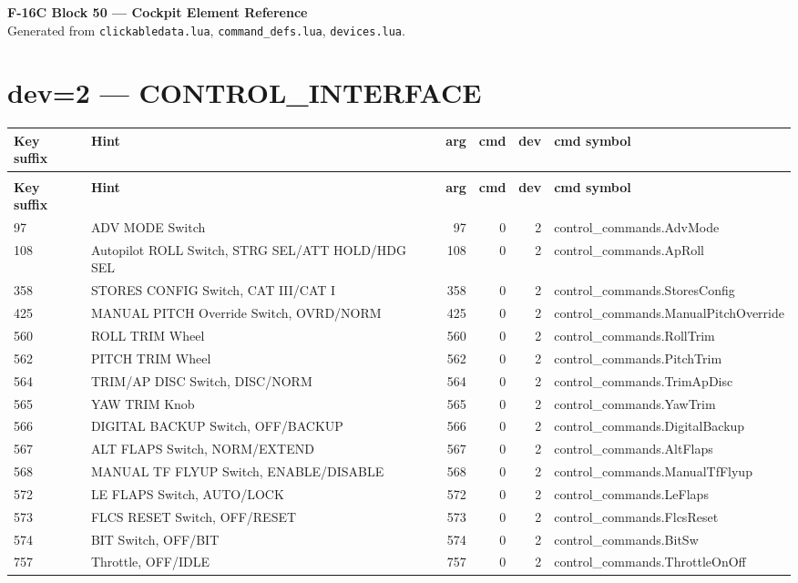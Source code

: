 \documentclass[10pt,a4paper]{article}
\begin{document}
{\LARGE\bfseries\color{hdr} F-16C Block 50 — Cockpit Element Reference}\\[2mm]
{\small Generated from \texttt{clickabledata.lua}, \texttt{command\_defs.lua}, \texttt{devices.lua}.}
\tableofcontents
\newpage
\section{dev=2 — CONTROL\_INTERFACE}
\begin{longtable}{>{\ttfamily\small}p{38mm} >{\small}p{72mm} r r r >{\ttfamily\small}p{48mm}}
\toprule
\textbf{Key suffix} & \textbf{Hint} & \textbf{arg} & \textbf{cmd} & \textbf{dev} & \textbf{cmd symbol} \\
\midrule
\endfirsthead
\multicolumn{6}{l}{\small\itshape continued\ldots}\\
\toprule
\textbf{Key suffix} & \textbf{Hint} & \textbf{arg} & \textbf{cmd} & \textbf{dev} & \textbf{cmd symbol} \\
\midrule
\endhead
\bottomrule
\endfoot
\rowcolor{rowodd}
  97 & ADV MODE Switch & 97 & 0 & 2 & control\_commands.AdvMode \\
  108 & Autopilot ROLL Switch, STRG SEL/ATT HOLD/HDG SEL & 108 & 0 & 2 & control\_commands.ApRoll \\
\rowcolor{rowodd}
  358 & STORES CONFIG Switch, CAT III/CAT I & 358 & 0 & 2 & control\_commands.StoresConfig \\
  425 & MANUAL PITCH Override Switch, OVRD/NORM & 425 & 0 & 2 & control\_commands.ManualPitchOverride \\
\rowcolor{rowodd}
  560 & ROLL TRIM Wheel & 560 & 0 & 2 & control\_commands.RollTrim \\
  562 & PITCH TRIM Wheel & 562 & 0 & 2 & control\_commands.PitchTrim \\
\rowcolor{rowodd}
  564 & TRIM/AP DISC Switch, DISC/NORM & 564 & 0 & 2 & control\_commands.TrimApDisc \\
  565 & YAW TRIM Knob & 565 & 0 & 2 & control\_commands.YawTrim \\
\rowcolor{rowodd}
  566 & DIGITAL BACKUP Switch, OFF/BACKUP & 566 & 0 & 2 & control\_commands.DigitalBackup \\
  567 & ALT FLAPS Switch, NORM/EXTEND & 567 & 0 & 2 & control\_commands.AltFlaps \\
\rowcolor{rowodd}
  568 & MANUAL TF FLYUP Switch, ENABLE/DISABLE & 568 & 0 & 2 & control\_commands.ManualTfFlyup \\
  572 & LE FLAPS Switch, AUTO/LOCK & 572 & 0 & 2 & control\_commands.LeFlaps \\
\rowcolor{rowodd}
  573 & FLCS RESET Switch, OFF/RESET & 573 & 0 & 2 & control\_commands.FlcsReset \\
  574 & BIT Switch, OFF/BIT & 574 & 0 & 2 & control\_commands.BitSw \\
\rowcolor{rowodd}
  757 & Throttle, OFF/IDLE & 757 & 0 & 2 & control\_commands.ThrottleOnOff \\
\end{longtable}
\end{document}
